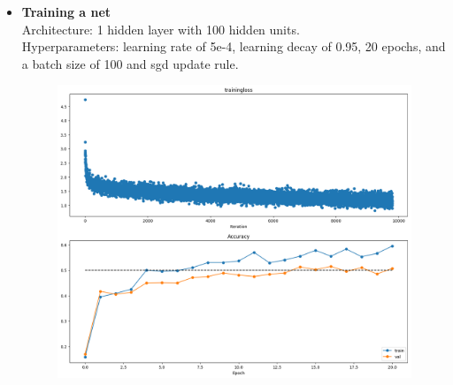 \begin{itemize}[topsep=-15pt, noitemsep, nolistsep]
  \item \textbf{Training a net}\\
    Architecture: 1 hidden layer with 100 hidden units.\\
    Hyperparameters: learning rate of 5e-4, learning decay of 0.95, 20 epochs, and a batch size of 100 and sgd update rule.
    
    \begin{figure}[!ht]
        \centering
        {{\includegraphics[scale = 0.32]{../nets/train_net/diagrams.png}}}  
    \end{figure}


\end{itemize}
